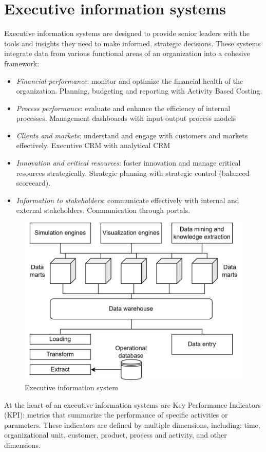 \section{Executive information systems}

Executive information systems are designed to provide senior leaders with the tools and insights they need to make informed, strategic decisions. 
These systems integrate data from various functional areas of an organization into a cohesive framework: 
\begin{itemize}
    \item \textit{Financial performance}: monitor and optimize the financial health of the organization.
        Planning, budgeting and reporting with Activity Based Costing. 
    \item \textit{Process performance}: evaluate and enhance the efficiency of internal processes.
        Management dashboards  with input-output process models
    \item \textit{Clients and markets}: understand and engage with customers and markets effectively.
        Executive CRM with analytical CRM 
    \item \textit{Innovation and critical resources}: foster innovation and manage critical resources strategically.
        Strategic planning with strategic control (balanced scorecard). 
    \item \textit{Information to stakeholders}: communicate effectively with internal and external stakeholders.
        Communication through portals.
\end{itemize}

\begin{figure}[H]
    \centering
    \includegraphics[width=0.5\linewidth]{images/bis4.png}
    \caption{Executive information system}
\end{figure}
At the heart of an executive information systems are Key Performance Indicators (KPI): metrics that summarize the performance of specific activities or parameters. 
These indicators are defined by multiple dimensions, including: time, organizational unit, customer, product, process and activity, and other dimensions.